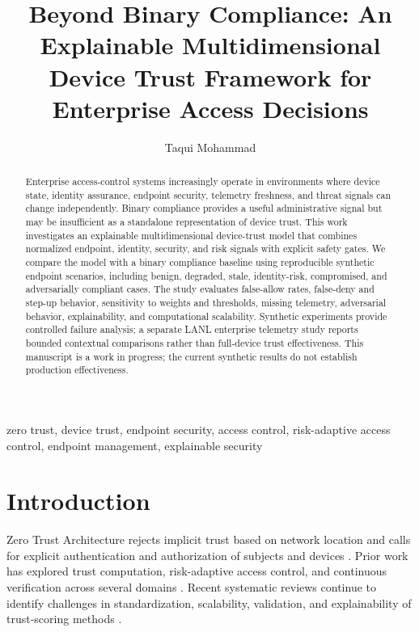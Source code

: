 \documentclass[journal]{IEEEtran}
\title{Beyond Binary Compliance: An Explainable Multidimensional Device Trust Framework for Enterprise Access Decisions}
\author{Taqui Mohammad}
\begin{document}
\maketitle

\begin{abstract}
Enterprise access-control systems increasingly operate in environments where device
state, identity assurance, endpoint security, telemetry freshness, and threat signals
can change independently. Binary compliance provides a useful administrative signal
but may be insufficient as a standalone representation of device trust. This work
investigates an explainable multidimensional device-trust model that combines
normalized endpoint, identity, security, and risk signals with explicit safety gates.
We compare the model with a binary compliance baseline using reproducible synthetic
endpoint scenarios, including benign, degraded, stale, identity-risk, compromised,
and adversarially compliant cases. The study evaluates false-allow rates, false-deny
and step-up behavior, sensitivity to weights and thresholds, missing telemetry,
adversarial behavior, explainability, and computational scalability. Synthetic
experiments provide controlled failure analysis; a separate LANL enterprise
telemetry study reports bounded contextual comparisons rather than full-device
trust effectiveness. This manuscript is a work in progress; the
current synthetic results do not establish production effectiveness.
\end{abstract}

\begin{IEEEkeywords}
zero trust, device trust, endpoint security, access control, risk-adaptive access
control, endpoint management, explainable security
\end{IEEEkeywords}

\section{Introduction}
Zero Trust Architecture rejects implicit trust based on network location and calls
for explicit authentication and authorization of subjects and devices
\cite{nist800207}. Prior work has explored trust computation, risk-adaptive access
control, and continuous verification across several domains
\cite{syed2022zta,bhattarai2024ami,albomi2024service}. Recent systematic reviews
continue to identify challenges in standardization, scalability, validation, and
explainability of trust-scoring methods \cite{ruambo2026tsa}.
\end{document}
